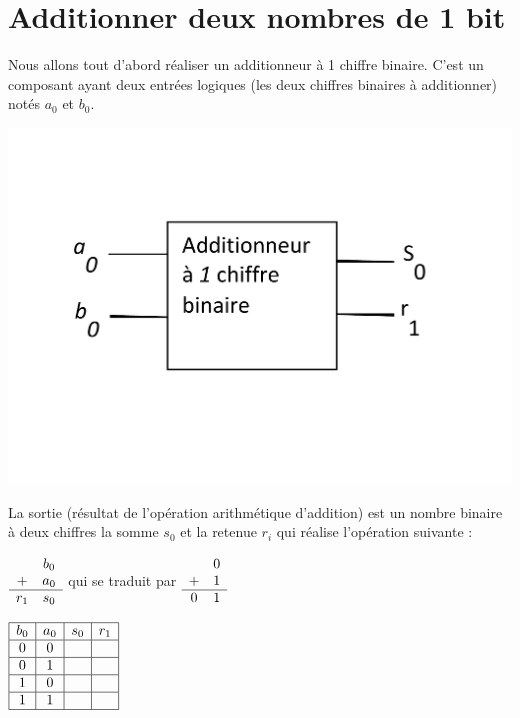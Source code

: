 \section{Additionner deux nombres de 1 bit}

\begin{minipage}{0.7\linewidth}
Nous allons tout d'abord réaliser un additionneur à 1 chiffre binaire. C'est un composant ayant deux entrées logiques (les deux chiffres binaires à additionner) notés $a_0$ et $b_0$.
\end{minipage}
\hfill
\begin{minipage}{0.28\linewidth}
 \centering\includegraphics[width=0.8\linewidth]{img/figures04.pdf}
\end{minipage}

La sortie (résultat de l'opération arithmétique d'addition) est un nombre binaire à deux chiffres la somme $s_0$ et la retenue $r_i$ qui réalise l'opération suivante :

$\begin{array}{c c}
 & b_0 \\
+& a_0 \\
\hline
r_1 & s_0
\end{array}$ qui se traduit par $\begin{array}{c c}
 & 0 \\
+& 1 \\
\hline
0 & 1
\end{array}$


\begin{center}
$\begin{array}{|c|c|c|c|}
\hline
b_0 & a_0 & s_0 & r_1 \\
\hline
0   & 0   &     & \\
\hline
0   & 1   &     & \\
\hline
1   & 0   &     & \\
\hline
1   & 1   &     & \\
\hline
\end{array}$
\end{center}

